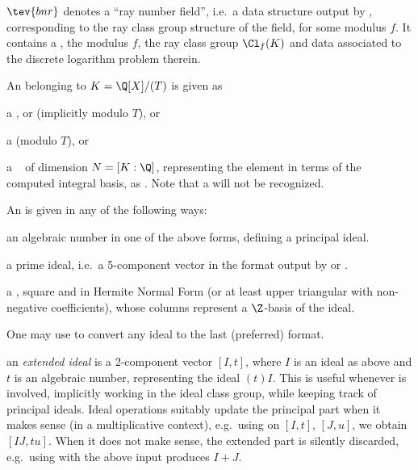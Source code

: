 \item $\tev{bnr}$ denotes a ``ray number field'', i.e.~a data structure
output by , corresponding to the ray class group structure of
the field, for some modulus $f$. It contains a , the modulus
$f$, the ray class group $\Cl_f(K)$ and data associated to
the discrete logarithm problem therein.


\noindent An  belonging to $K = \Q[X]/(T)$ is given as

\item a ,  or  (implicitly modulo $T$), or

\item a  (modulo $T$), or

\item a ~ of dimension $N = [K:\Q]$, representing
the element in terms of the computed integral basis, as
. Note that a 
will not be recognized.
\medskip

\noindent An  is given in any of the following ways:

\item an algebraic number in one of the above forms, defining a principal ideal.

\item a prime ideal, i.e.~a 5-component vector in the format output by
 or .

\item a , square and in Hermite Normal Form (or at least
upper triangular with non-negative coefficients), whose columns represent a
$\Z$-basis of the ideal.

One may use  to convert any ideal to the last (preferred) format.

\item an \emph{extended ideal}  is a 2-component
vector $[I, t]$, where $I$ is an ideal as above and $t$ is an algebraic
number, representing the ideal $(t)I$. This is useful whenever 
is involved, implicitly working in the ideal class group, while keeping track
of principal ideals. Ideal operations suitably update the principal part
when it makes sense (in a multiplicative context), e.g.~using 
on $[I,t]$, $[J,u]$, we obtain $[IJ, tu]$. When it does not make sense, the
extended part is silently discarded, e.g.~using  with the above
input produces $I+J$.

